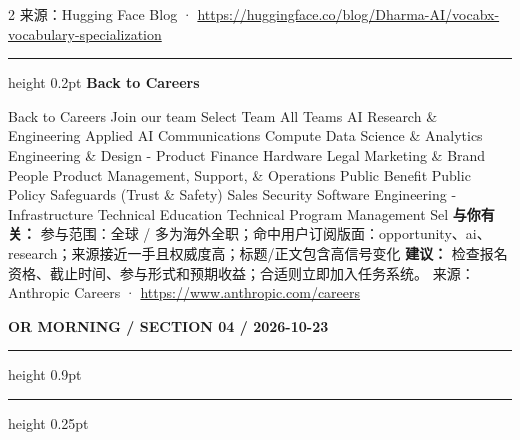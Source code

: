 \documentclass[10.5pt]{ctexart}
\begin{document}
\begin{multicols}{2}
{\footnotesize\color{ormuted} 来源：Hugging Face Blog · \url{https://huggingface.co/blog/Dharma-AI/vocabx-vocabulary-specialization}}
\vspace{2mm}
\hrule height 0.2pt
\vspace{2mm}
{\large\bfseries Back to Careers}\par
Back to Careers Join our team Select Team All Teams AI Research \& Engineering Applied AI Communications Compute Data Science \& Analytics Engineering \& Design - Product Finance Hardware Legal Marketing \& Brand People Product Management, Support, \& Operations Public Benefit Public Policy Safeguards (Trust \& Safety) Sales Security Software Engineering - Infrastructure Technical Education Technical Program Management Sel
\textbf{与你有关：} 参与范围：全球 / 多为海外全职；命中用户订阅版面：opportunity、ai、research；来源接近一手且权威度高；标题/正文包含高信号变化
\textbf{建议：} 检查报名资格、截止时间、参与形式和预期收益；合适则立即加入任务系统。
{\footnotesize\color{ormuted} 来源：Anthropic Careers · \url{https://www.anthropic.com/careers}}
\end{multicols}
\newpage
{\small\bfseries OR MORNING / SECTION 04 / 2026-10-23}
\vspace{2mm}
\hrule height 0.9pt
\vspace{1.5mm}
\hrule height 0.25pt
\vspace{4mm}
\end{document}
